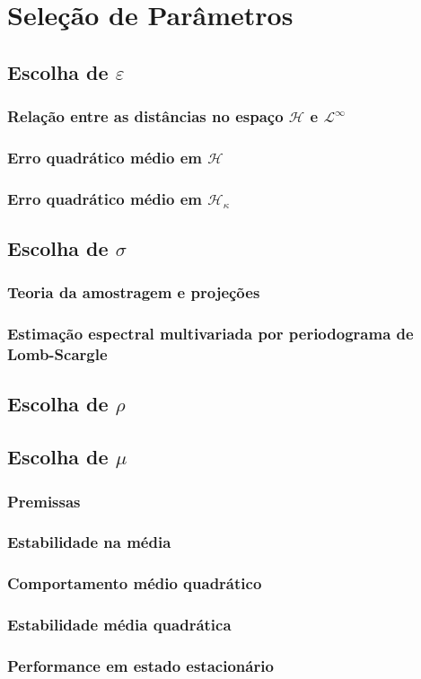 \chapter{Seleção de Parâmetros} \label{cap:selecao}

\section{Escolha de $\varepsilon$}

\subsection{Relação entre as distâncias no espaço $\mathcal{H}$ e $\mathcal{L}^{\infty}$}

\subsection{Erro quadrático médio em $\mathcal{H}$}

\subsection{Erro quadrático médio em $\mathcal{H}_\kappa$}

\section{Escolha de $\sigma$}

\subsection{Teoria da amostragem e projeções}

\subsection{Estimação espectral multivariada por periodograma de Lomb-Scargle}

\section{Escolha de $\rho$}

\section{Escolha de $\mu$}

\subsection{Premissas}

\subsection{Estabilidade na média}

\subsection{Comportamento médio quadrático}

\subsection{Estabilidade média quadrática}

\subsection{Performance em estado estacionário}